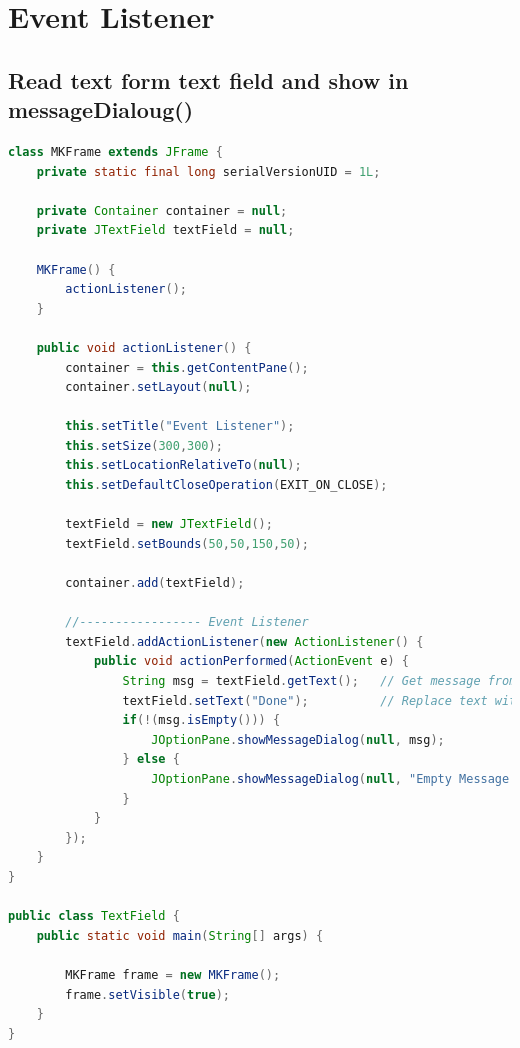 \newpage
\section{Event Listener}

\subsection{Read text form text field and show in messageDialoug()}

\begin{frame}

\begin{lstlisting}[language=java]
class MKFrame extends JFrame {
	private static final long serialVersionUID = 1L;
	
	private Container container = null;
	private JTextField textField = null;
	
	MKFrame() {
		actionListener();
	}
	
	public void actionListener() {
		container = this.getContentPane();
		container.setLayout(null);
		
		this.setTitle("Event Listener");
		this.setSize(300,300);
		this.setLocationRelativeTo(null);
		this.setDefaultCloseOperation(EXIT_ON_CLOSE);
		
		textField = new JTextField();
		textField.setBounds(50,50,150,50);
		
		container.add(textField);
		
		//----------------- Event Listener
		textField.addActionListener(new ActionListener() {
			public void actionPerformed(ActionEvent e) {
				String msg = textField.getText();	// Get message from textField
				textField.setText("Done");			// Replace text with "Done" msg
				if(!(msg.isEmpty())) {
					JOptionPane.showMessageDialog(null, msg);
				} else {
					JOptionPane.showMessageDialog(null, "Empty Message !");
				}
			}
		});
	}
}

public class TextField {
	public static void main(String[] args) {
		
		MKFrame frame = new MKFrame();
		frame.setVisible(true);
	}
}
\end{lstlisting}


\end{frame}

